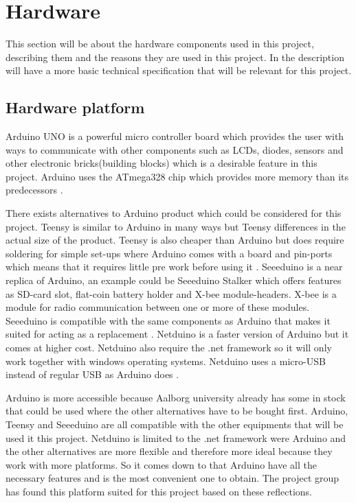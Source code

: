 \section{Hardware}
This section will be about the hardware components used in this project, describing them and the reasons they are used in this project. In the description will have a more basic technical specification that will be relevant for this project.

\subsection{Hardware platform}
\label{sec:hardwarearduino}
Arduino UNO is a powerful micro controller board which provides the user with ways to communicate with other components such as LCDs, diodes, sensors and other electronic bricks(building blocks) which is a desirable feature in this project. Arduino uses the ATmega328 chip which provides more memory than its predecessors \citep{ArduinoUno}.

There exists alternatives to Arduino product which could be considered for this project. Teensy is similar to Arduino in many ways but Teensy differences in the actual size of the product. Teensy is also cheaper than Arduino but does require soldering for simple set-ups where Arduino comes with a board and pin-ports which means that it requires little pre work before using it \citep{Teensy}.
Seeeduino is a near replica of Arduino, an example could be Seeeduino Stalker which offers features as SD-card slot, flat-coin battery holder and X-bee module-headers. X-bee is a module for radio communication between one or more of these modules. Seeeduino is compatible with the same components as 
Arduino that makes it suited for acting as a replacement \citep{Seedui}.
Netduino is a faster version of Arduino but it comes at higher cost. Netduino also require the .net framework so it will only work together with windows operating systems. Netduino uses a micro-USB instead of regular USB as Arduino does \citep{Netdui}.

Arduino is more accessible because Aalborg university already has some in stock that could be used where the other alternatives have to be bought first. Arduino, Teensy and Seeeduino are all compatible with the other equipments that will be used it this project. Netduino is limited to the .net framework were Arduino and the other alternatives are more flexible and therefore more ideal because they work with more platforms.
So it comes down to that Arduino have all the necessary features and is the most convenient one to obtain. The project group has found this platform suited for this project based on these reflections. 

